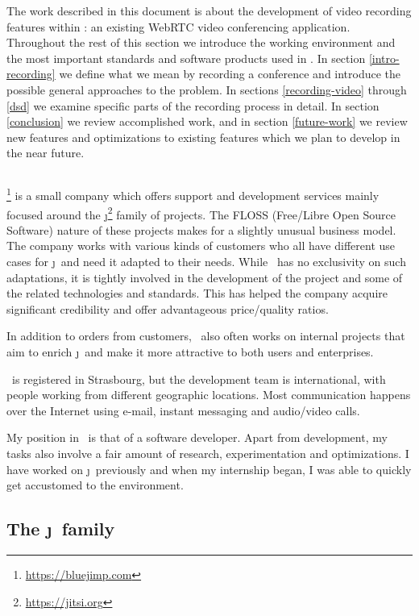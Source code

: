 \documentclass[twoside,openright,a4paper,12pt,english]{article}
\begin{document}
The work described in this document is about the development of video recording features
within \jm: an existing WebRTC video conferencing application. Throughout
the rest of this section we introduce the working environment and the most
important standards and software products used in \jm. In section
\ref{intro-recording} we define 
what we mean by recording a conference and introduce the possible general
approaches to the problem.
In sections \ref{recording-video} through \ref{dsd} we examine specific
parts of the recording process in detail. 
In section \ref{conclusion} we review accomplished work, and 
in section \ref{future-work} we
review new features and optimizations to existing features which we plan to
develop in the near future. 



\subsection{\bj}
\bj\footnote{\url{https://bluejimp.com}} is a small company which
offers support and development services mainly focused around the
\j\footnote{\url{https://jitsi.org}}
 family of projects. The FLOSS (Free/Libre Open Source Software)
nature of these projects makes for a slightly unusual business model. The
company works with various kinds of customers who all have different use cases
for \j\ and need it adapted to their needs. While \bj\ has no exclusivity
on such adaptations, it is tightly involved in the development of the project
and some of the related technologies and standards. This has helped the company
acquire significant credibility and offer advantageous price/quality ratios.

In addition to orders from customers, \bj\ also often works on internal projects
that aim to enrich \j\ and make it more attractive to both users and
enterprises. 

\bj\ is registered in Strasbourg, but the development team is international,
with people working from different geographic locations. Most communication happens over
the Internet using e-mail, instant messaging and audio/video calls.

My position in \bj\ is that of a software developer. Apart from development, my tasks also 
involve a fair amount of research, experimentation and optimizations. I have
worked on \j\ previously and when my internship began, I was able to quickly
get accustomed to the environment. 




\subsection{The \j\ family}
\label{intro-jitsi}
\end{document}
